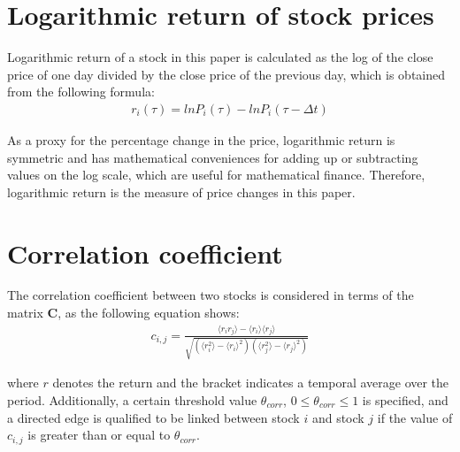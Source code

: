 \section{Logarithmic return of stock prices}
Logarithmic return of a stock in this paper is calculated as the log of the close price of one day divided by the close price of the previous day, which is obtained from the following formula:
\begin{eqnarray}\label{equ:log}
r_i(\tau)=lnP_i(\tau)-lnP_i(\tau-\Delta t)
\end{eqnarray}

 As a proxy for the percentage change in the price, logarithmic return is symmetric and has mathematical conveniences for adding up or subtracting values on the log scale, which are useful for mathematical finance. Therefore, logarithmic return is the measure of price changes in this paper.

\section{Correlation coefficient}
The correlation coefficient between two stocks is considered in terms of the matrix \textbf{C}, as the following equation shows:
\begin{eqnarray}\label{equ:corr}
c_{i,j}=\frac{\langle r_ir_j \rangle-\langle r_i\rangle \langle r_j\rangle}{\sqrt{(\langle r_i^2\rangle-\langle r_i\rangle^2)(\langle r_j^2\rangle-\langle r_j\rangle^2)}}
\end{eqnarray}

where $r$ denotes the return and the bracket indicates a temporal average over the period. Additionally, a certain threshold value $\theta_{corr}$, $0\leq \theta_{corr} \leq1$ is specified, and a directed edge is qualified to be linked between stock $i$ and stock $j$ if the value of $c_{i,j}$ is greater than or equal to $\theta_{corr}$.